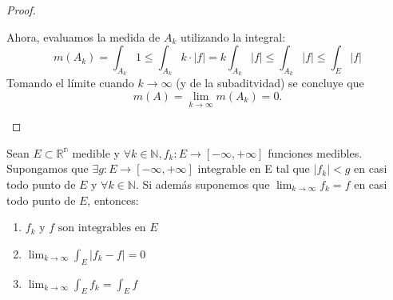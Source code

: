 \begin{proof}
\begin{enumerate}
              Ahora, evaluamos la medida de $ A_k $ utilizando la integral: $$ m(A_k) =
                  \int_{A_k} 1 \leq \int_{A_k} k \cdot |f| = k \int_{A_k} |f| \leq \int_{A_k} |f|
                  \leq \int_E |f|$$ Tomando el límite cuando $ k \to \infty $ (y de la
              subaditvidad) se concluye que $$ m(A) = \lim_{k \to \infty} m(A_k) = 0. $$
    \end{enumerate}
\end{proof}
\begin{teorema} 
    Sean $E \subset \mathbb{R^n}$ medible y $\forall k \in \mathbb{N}, f_k: E \to [-\infty, +\infty]$ funciones medibles. Supongamos que $\exists g: E \to [-\infty, +\infty]$ integrable en E tal que $|f_k| < g$ en casi todo punto de $E$ y $\forall k \in \mathbb{N}$. Si además suponemos que $\lim_{k \to \infty} f_k = f$ en casi todo punto de $E$, entonces:
    \vspace{-0.5em}
    \begin{enumerate}
        \item $f_k \text{ y } f \text{ son integrables en }E$
        \item $\lim_{k \to \infty} \int_{E} |f_k - f| = 0$
        \item $\lim_{k \to \infty} \int_{E} f_k = \int_{E} f$
    \end{enumerate}
\end{teorema}
